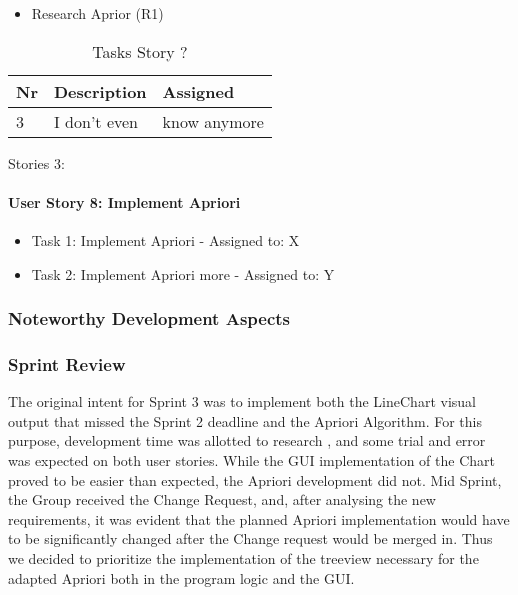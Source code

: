\begin{itemize}	
	\item Research Aprior (R1) 
\end{itemize}

\begin{table}[h]
  \caption{Tasks Story ?}
  \label{Story ? Tasks}
  \centering
  \begin{tabular}{p{1cm}|p{5cm}|p{3cm}|}
  	Nr & Description & Assigned \\ 
  	\hline
  	3 & I don't even & know anymore \\ 
  	\hline
  \end{tabular}
\end{table}

Stories 3:

\paragraph*{User Story 8: Implement Apriori}

\begin{itemize}
	\item Task 1: Implement Apriori  - Assigned to: X
	\item Task 2: Implement Apriori more - Assigned to: Y
\end{itemize}

\subsubsection*{Noteworthy Development Aspects}

\subsubsection*{Sprint Review}
The original intent for Sprint 3 was to implement both the LineChart visual output that missed the Sprint 2 deadline and the Apriori Algorithm. For this purpose, development time was allotted to research , and some trial and error was expected on both user stories. 
While the GUI implementation of the Chart proved to be easier than expected, the Apriori development did not. Mid Sprint, the Group received the Change Request, and, after analysing the new requirements, it was evident that the planned Apriori implementation would have to be significantly changed after the Change request would be merged in. 
Thus we decided to prioritize the implementation of the treeview necessary for the adapted Apriori both in the program logic and the GUI. 
